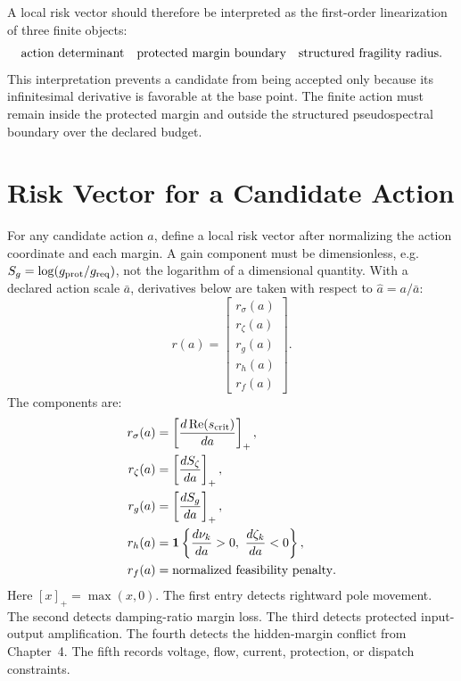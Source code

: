 A local risk vector should therefore be interpreted as the first-order
linearization of three finite objects:
\begin{equation}
  \hbox{action determinant}
  \quad
  \hbox{protected margin boundary}
  \quad
  \hbox{structured fragility radius}.
  \label{eq:imp_finite_action_objects}
\end{equation}
This interpretation prevents a candidate from being accepted only because its
infinitesimal derivative is favorable at the base point. The finite action must
remain inside the protected margin and outside the structured pseudospectral
boundary over the declared budget.

\section{Risk Vector for a Candidate Action}

For any candidate action \(a\), define a local risk vector after normalizing the
action coordinate and each margin. A gain component must be dimensionless, e.g.
\(S_g=\log(g_{\rm prot}/g_{\rm req})\), not the logarithm of a dimensional
quantity. With a declared action scale \(\bar a\), derivatives below are taken
with respect to \(\hat a=a/\bar a\):
\begin{equation}
  r(a)=
  \begin{bmatrix}
  r_\sigma(a)\\
  r_\zeta(a)\\
  r_g(a)\\
  r_h(a)\\
  r_f(a)
  \end{bmatrix}.
  \label{eq:risk_vector}
\end{equation}
The components are:
\begin{align}
  r_\sigma(a)
  &=
  \left[
  \frac{d\Real(s_{\rm crit})}{da}
  \right]_+,
  \label{eq:risk_sigma}\\
  r_\zeta(a)
  &=
  \left[
  \frac{dS_\zeta}{da}
  \right]_+,
  \label{eq:risk_zeta}\\
  r_g(a)
  &=
  \left[
  \frac{dS_g}{da}
  \right]_+,
  \label{eq:risk_gain}\\
  r_h(a)
  &=
  \mathbf 1\left\{
  \frac{d\nu_k}{da}>0,\ 
  \frac{d\zeta_k}{da}<0
  \right\},
  \label{eq:risk_hidden}\\
  r_f(a)
  &=
  \hbox{normalized feasibility penalty}.
  \label{eq:risk_feasibility}
\end{align}
Here \([x]_+=\max(x,0)\). The first entry detects rightward pole movement. The
second detects damping-ratio margin loss. The third detects protected
input-output amplification. The fourth detects the hidden-margin conflict from
Chapter~4. The fifth records voltage, flow, current, protection, or dispatch
constraints.

